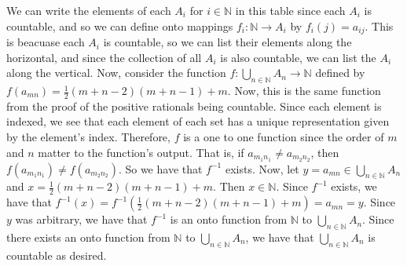 \begin{solution}
    We can write the elements of each $A_i$ for $i\in\mathbb{N}$ in this table since each $A_i$ is
    countable, and so we can define onto mappings $f_i:\mathbb{N}\rightarrow A_i$ by $f_i(j)=a_{ij}$.
    This is beacuase each $A_i$ is countable, so we can list their elements along the horizontal, and
    since the collection of all $A_i$ is also countable, we can list the $A_i$ along the vertical. Now,
    consider the function $f:\bigcup_{n\in\mathbb{N}}A_n\rightarrow\mathbb{N}$ defined by
    $f(a_{mn})=\frac12(m+n-2)(m+n-1)+m$. Now, this is the same function from the proof of the positive
    rationals being countable. Since each element is indexed, we see that each element of each set has a
    unique representation given by the element's index. Therefore, $f$ is a one to one function since
    the order of $m$ and $n$ matter to the function's output. That is, if $a_{m_1n_1}\neq a_{m_2n_2}$,
    then $f(a_{m_1n_1})\neq f(a_{m_2n_2})$. So we have that $f^{-1}$ exists. Now, let
    $y=a_{mn}\in\bigcup_{n\in\mathbb{N}}A_n$ and $x=\frac12(m+n-2)(m+n-1)+m$. Then $x\in\mathbb{N}$.
    Since $f^{-1}$ exists, we have that $f^{-1}(x)=f^{-1}(\frac12(m+n-2)(m+n-1)+m)=a_{mn}=y$. Since $y$
    was arbitrary, we have that $f^{-1}$ is an onto function from $\mathbb{N}$ to
    $\bigcup_{n\in\mathbb{N}}A_n$. Since there exists an onto function from $\mathbb{N}$ to
    $\bigcup_{n\in\mathbb{N}}A_n$, we have that $\bigcup_{n\in\mathbb{N}}A_n$ is countable as desired.        

\end{solution}